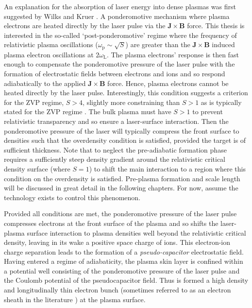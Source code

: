 An explanation for the absorption of laser energy into dense plasmas was first suggested by Wilks and Kruer \cite{wilksAbsorptionUltraIntenseLaser1992}. A ponderomotive mechanism where plasma electrons are heated directly by the laser pulse via the $\mathbf{J}\times \mathbf{B}$ force. This thesis is interested in the so-called `post-ponderomotive' regime where the frequency of relativistic plasma oscillations ($\omega_\mathrm{p} \sim \sqrt{S}$) are greater than the $\mathbf{J}\times \mathbf{B}$ induced plasma electron oscillations at $2\omega_\mathrm{L}$. The plasma electrons' response is then fast enough to compensate the ponderomotive pressure of the laser pulse with the formation of electrostatic fields between electrons and ions and so respond adiabatically to the applied $\mathbf{J}\times \mathbf{B}$ force. Hence, plasma electrons cannot be heated directly by the laser pulse. Interestingly, this condition suggests a criterion for the \ac{ZVP} regime, $S > 4$, slightly more constraining than $S>1$ as is typically stated for the \ac{ZVP} regime \cite{savinModellingLaserPlasmaInteractions2019}. The bulk plasma must have $S>1$ to prevent relativistic transparency and so ensure a laser-surface interaction. Then the ponderomotive pressure of the laser will typically compress the front surface to densities such that the overdensity condition is satisfied, provided the target is of sufficient thickness. Note that to neglect the pre-adiabatic formation phase requires a sufficiently steep density gradient around the relativistic critical density surface (where $S=1$) to shift the main interaction to a region where this condition on the overdensity is satisfied. Pre-plasma formation and scale length will be discussed in great detail in the following chapters. For now, assume the technology exists to control this phenomenon. 

Provided all conditions are met, the ponderomotive pressure of the laser pulse compresses electrons at the front surface of the plasma and so shifts the laser-plasma surface interaction to plasma densities well beyond the relativistic critical density, leaving in its wake a positive space charge of ions. This electron-ion charge separation leads to the formation of a \textit{pseudo-capacitor} electrostatic field. Having entered a regime of adiabaticity, the plasma skin layer is confined within a potential well consisting of the ponderomotive pressure of the laser pulse and the Coulomb potential of the pseudocapacitor field. Thus is formed a high density and longitudinally thin electron bunch (sometimes referred to as an electron sheath in the literature \cite{gonoskovUltrarelativisticNanoplasmonicsRoute2011}) at the plasma surface.

